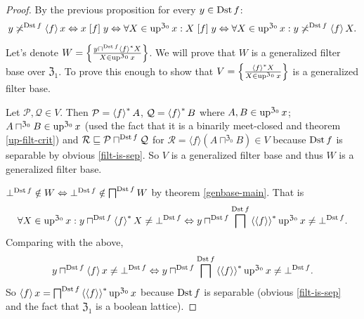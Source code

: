 \begin{proof}
By the previous proposition for every $y\in\operatorname{Dst} f$:
\[
y\not\asymp^{\operatorname{Dst} f}\left\langle f\right\rangle x\Leftrightarrow x\mathrel{\left[f\right]}y\Leftrightarrow\forall X\in\operatorname{up}^{\mathfrak{Z}_{0}}x:X\mathrel{\left[f\right]}y\Leftrightarrow\forall X\in\operatorname{up}^{\mathfrak{Z}_{0}}x:y\not\asymp^{\operatorname{Dst} f}\left\langle f\right\rangle X.
\]


Let's denote $W=\left\{ \frac{y\sqcap^{\operatorname{Dst} f}\left\langle f\right\rangle ^{\ast}X}{X\in\operatorname{up}^{\mathfrak{Z}_{0}}x}\right\}$.
We will prove that $W$ is a generalized filter base over $\mathfrak{Z}_{1}$.
To prove this enough to show that $V=\left\{ \frac{\left\langle f\right\rangle ^{\ast}X}{X\in\operatorname{up}^{\mathfrak{Z}_{0}}x}\right\}$
is a generalized filter base.

Let $\mathcal{P},\mathcal{Q}\in V$. Then $\mathcal{P}=\left\langle f\right\rangle ^{\ast}A$,
$\mathcal{Q}=\left\langle f\right\rangle ^{\ast}B$ where $A,B\in\operatorname{up}^{\mathfrak{Z}_{0}}x$;
$A\sqcap^{\mathfrak{Z}_{0}}B\in\operatorname{up}^{\mathfrak{Z}_{0}}x$
(used the fact that it is a binarily meet-closed and theorem \ref{up-filt-crit})
and $\mathcal{R}\sqsubseteq\mathcal{P}\sqcap^{\operatorname{Dst} f}\mathcal{Q}$
for $\mathcal{R}=\langle f\rangle(A\sqcap^{\mathfrak{Z}_{0}}B)\in V$
because $\operatorname{Dst} f$ is separable by obvious \ref{filt-is-sep}. So $V$
is a generalized filter base and thus $W$ is a generalized filter
base.

$\bot^{\operatorname{Dst} f}\notin W\Leftrightarrow\bot^{\operatorname{Dst} f}\notin\bigsqcap^{\operatorname{Dst} f}W$
by theorem \ref{genbase-main}. That is
\[
\forall X\in\operatorname{up}^{\mathfrak{Z}_{0}}x:y\sqcap^{\operatorname{Dst} f}\left\langle f\right\rangle ^{\ast}X\ne\bot^{\operatorname{Dst} f}\Leftrightarrow y\sqcap^{\operatorname{Dst} f}\bigsqcap^{\operatorname{Dst} f}\left\langle \left\langle f\right\rangle\right\rangle ^{\ast}\operatorname{up}^{\mathfrak{Z}_{0}}x\ne\bot^{\operatorname{Dst} f}.
\]
Comparing with the above, 
\[
y\sqcap^{\operatorname{Dst} f}\left\langle f\right\rangle x\ne\bot^{\operatorname{Dst} f}\Leftrightarrow y\sqcap^{\operatorname{Dst} f}\bigsqcap^{\operatorname{Dst} f}\left\langle \left\langle f\right\rangle\right\rangle ^{\ast}\operatorname{up}^{\mathfrak{Z}_{0}}x\ne\bot^{\operatorname{Dst} f}.
\]
So $\left\langle f\right\rangle x=\bigsqcap^{\operatorname{Dst} f}\left\langle \left\langle f\right\rangle\right\rangle ^{\ast}\operatorname{up}^{\mathfrak{Z}_{0}}x$
because $\operatorname{Dst} f$ is separable (obvious \ref{filt-is-sep} and the
fact that $\mathfrak{Z}_{1}$ is a boolean lattice).\end{proof}

